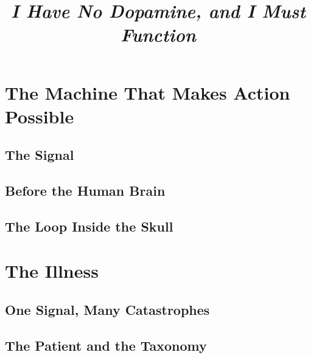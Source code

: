 \documentclass[12pt, openany, oneside]{book}
\title{\textit{I Have No Dopamine, and I Must Function}}
\author{}
\date{}
\begin{document}

\frontmatter
\maketitle
\clearpage
\tableofcontents
\clearpage

\mainmatter

\part{The Machine That Makes Action Possible}

\chapter{The Signal}



\chapter{Before the Human Brain}




\chapter{The Loop Inside the Skull}


% 

\part{The Illness}

\chapter{One Signal, Many Catastrophes}


\chapter{The Patient and the Taxonomy}




\end{document}
